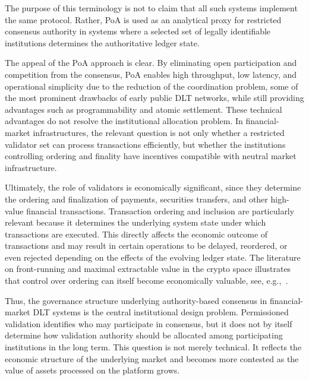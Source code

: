 \documentclass[
reprint,
showkeys,
superscriptaddress,
aps,
pra,
longbibliography,
nofootinbib,
]{revtex4-2}
\theoremstyle{definition}\newtheorem{definition}{Definition}
\begin{document}
The purpose of this terminology is not to claim that all such systems implement the same protocol.
Rather, PoA is used as an analytical proxy for restricted consensus authority in systems where a selected set of legally identifiable institutions determines the authoritative ledger state.



The appeal of the PoA approach is clear. 
By eliminating open participation and competition from the consensus, PoA enables high throughput, low latency, and operational simplicity due to the reduction of the coordination problem, some of the most prominent drawbacks of early public DLT networks, while still providing advantages such as programmability and atomic settlement.
These technical advantages do not resolve the institutional allocation problem.
In financial-market infrastructures, the relevant question is not only whether a restricted validator set can process transactions efficiently, but whether the institutions controlling ordering and finality have incentives compatible with neutral market infrastructure.

Ultimately, the role of validators is economically significant, since they determine the ordering and finalization of payments, securities transfers, and other high-value financial transactions. 
Transaction ordering and inclusion are particularly relevant because it determines the underlying system state under which transactions are executed.
This directly affects the economic outcome of transactions and may result in certain operations to be delayed, reordered, or even rejected depending on the effects of the evolving ledger state.
The literature on front-running and maximal extractable value in the crypto space illustrates that control over ordering can itself become economically valuable, see, e.g.,~\cite{daian2020flashboys,eskandari2019transparent}.


Thus, the governance structure underlying authority-based consensus in financial-market DLT systems is the central institutional design problem.
Permissioned validation identifies who may participate in consensus, but it does not by itself determine how validation authority should be allocated among participating institutions in the long term.
This question is not merely technical.
It reflects the economic structure of the underlying market and becomes more contested as the value of assets processed on the platform grows.
\end{document}
